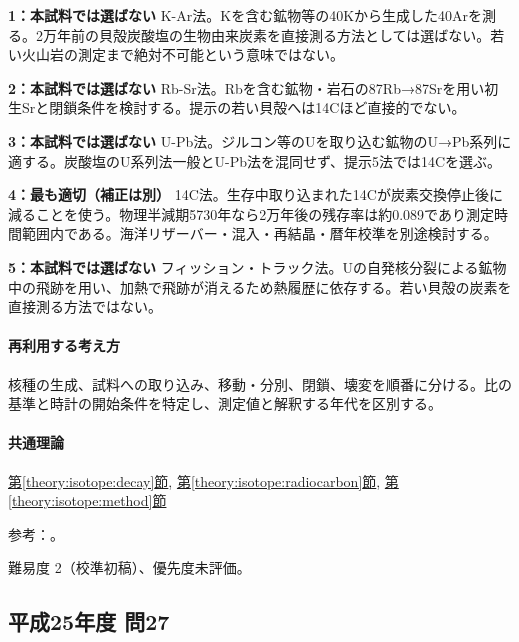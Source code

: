 \noindent\textbf{1：本試料では選ばない} K-Ar法。Kを含む鉱物等の40Kから生成した40Arを測る。2万年前の貝殻炭酸塩の生物由来炭素を直接測る方法としては選ばない。若い火山岩の測定まで絶対不可能という意味ではない。\par

\noindent\textbf{2：本試料では選ばない} Rb-Sr法。Rbを含む鉱物・岩石の87Rb→87Srを用い初生Srと閉鎖条件を検討する。提示の若い貝殻へは14Cほど直接的でない。\par

\noindent\textbf{3：本試料では選ばない} U-Pb法。ジルコン等のUを取り込む鉱物のU→Pb系列に適する。炭酸塩のU系列法一般とU-Pb法を混同せず、提示5法では14Cを選ぶ。\par

\noindent\textbf{4：最も適切（補正は別）} 14C法。生存中取り込まれた14Cが炭素交換停止後に減ることを使う。物理半減期5730年なら2万年後の残存率は約0.089であり測定時間範囲内である。海洋リザーバー・混入・再結晶・暦年校準を別途検討する。\par

\noindent\textbf{5：本試料では選ばない} フィッション・トラック法。Uの自発核分裂による鉱物中の飛跡を用い、加熱で飛跡が消えるため熱履歴に依存する。若い貝殻の炭素を直接測る方法ではない。\par

\paragraph{再利用する考え方} 核種の生成、試料への取り込み、移動・分別、閉鎖、壊変を順番に分ける。比の基準と時計の開始条件を特定し、測定値と解釈する年代を区別する。

\paragraph{共通理論} \hyperref[theory:isotope:decay]{第\ref*{theory:isotope:decay}節}, \hyperref[theory:isotope:radiocarbon]{第\ref*{theory:isotope:radiocarbon}節}, \hyperref[theory:isotope:method]{第\ref*{theory:isotope:method}節}

\par 参考：\cite{iso_radiometric,iso_shell}。

\par 難易度 2（校準初稿）、優先度未評価。

\subsection{平成25年度 問27}
\label{q:h25-reg-applied-27}

